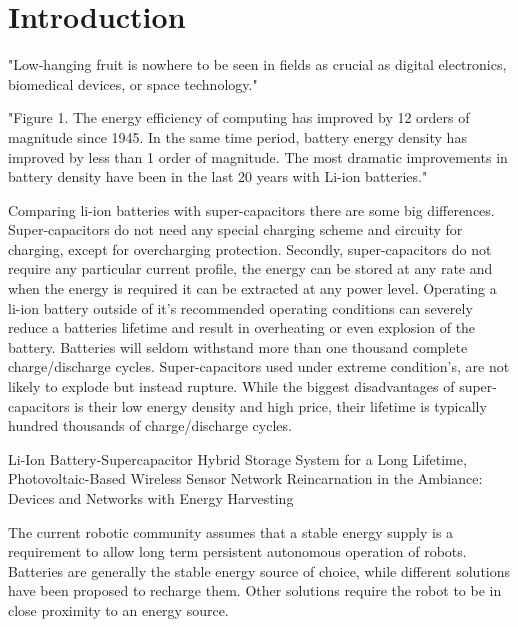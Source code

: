 \chapter{Introduction}
\label{chp:introduction}




"Low-hanging fruit is nowhere to be seen in fields as crucial as digital electronics, biomedical devices, or space technology."
\cite{zachary_spec_2016}

"Figure 1. The energy efficiency of computing has improved by 12 orders of magnitude since 1945. In the same time period, battery energy density has improved by less than 1 order of magnitude. The most dramatic improvements in battery density have been in the last 20 years with Li-ion batteries."
\cite{patel_pvc_2017}

Comparing li-ion batteries with super-capacitors there are some big differences.
Super-capacitors do not need any special charging scheme and circuity for charging, except for overcharging protection.
Secondly, super-capacitors do not require any particular current profile, the energy can be stored at any rate and when the energy is required it can be extracted at any power level.
Operating a li-ion battery outside of it's recommended operating conditions can severely reduce a batteries lifetime and result in overheating or even explosion of the battery.
Batteries will seldom withstand more than one thousand complete charge/discharge cycles.
Super-capacitors used under extreme condition's, are not likely to explode but instead rupture.
While the biggest disadvantages of super-capacitors is their low energy density and high price, their lifetime is typically hundred thousands of charge/discharge cycles.

Li-Ion Battery-Supercapacitor Hybrid Storage System for a Long Lifetime, Photovoltaic-Based Wireless Sensor Network	\cite{ongaro_pwre_2012}
Reincarnation in the Ambiance: Devices and Networks with Energy Harvesting \cite{prasad_comst_2014}


The current robotic community assumes that a stable energy supply is a requirement to allow long term persistent autonomous operation of robots.
Batteries are generally the stable energy source of choice, while different solutions have been proposed to recharge them.
Other solutions require the robot to be in close proximity to an energy source.

